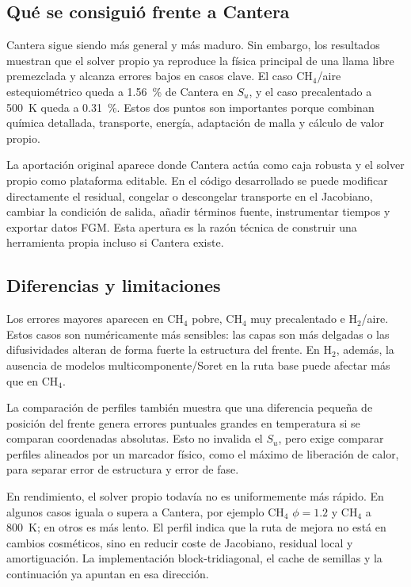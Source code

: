 \documentclass[12pt,a4paper]{article}
\begin{document}
\subsection{Qué se consiguió frente a Cantera}

Cantera sigue siendo más general y más maduro. Sin embargo, los resultados muestran que el solver propio ya reproduce la física principal de una llama libre premezclada y alcanza errores bajos en casos clave. El caso CH$_4$/aire estequiométrico queda a \SI{1.56}{\percent} de Cantera en $S_u$, y el caso precalentado a \SI{500}{K} queda a \SI{0.31}{\percent}. Estos dos puntos son importantes porque combinan química detallada, transporte, energía, adaptación de malla y cálculo de valor propio.

La aportación original aparece donde Cantera actúa como caja robusta y el solver propio como plataforma editable. En el código desarrollado se puede modificar directamente el residual, congelar o descongelar transporte en el Jacobiano, cambiar la condición de salida, añadir términos fuente, instrumentar tiempos y exportar datos FGM. Esta apertura es la razón técnica de construir una herramienta propia incluso si Cantera existe.

\subsection{Diferencias y limitaciones}

Los errores mayores aparecen en CH$_4$ pobre, CH$_4$ muy precalentado e H$_2$/aire. Estos casos son numéricamente más sensibles: las capas son más delgadas o las difusividades alteran de forma fuerte la estructura del frente. En H$_2$, además, la ausencia de modelos multicomponente/Soret en la ruta base puede afectar más que en CH$_4$.

La comparación de perfiles también muestra que una diferencia pequeña de posición del frente genera errores puntuales grandes en temperatura si se comparan coordenadas absolutas. Esto no invalida el $S_u$, pero exige comparar perfiles alineados por un marcador físico, como el máximo de liberación de calor, para separar error de estructura y error de fase.

En rendimiento, el solver propio todavía no es uniformemente más rápido. En algunos casos iguala o supera a Cantera, por ejemplo CH$_4$ $\phi=1.2$ y CH$_4$ a \SI{800}{K}; en otros es más lento. El perfil indica que la ruta de mejora no está en cambios cosméticos, sino en reducir coste de Jacobiano, residual local y amortiguación. La implementación block-tridiagonal, el cache de semillas y la continuación ya apuntan en esa dirección.
\end{document}
